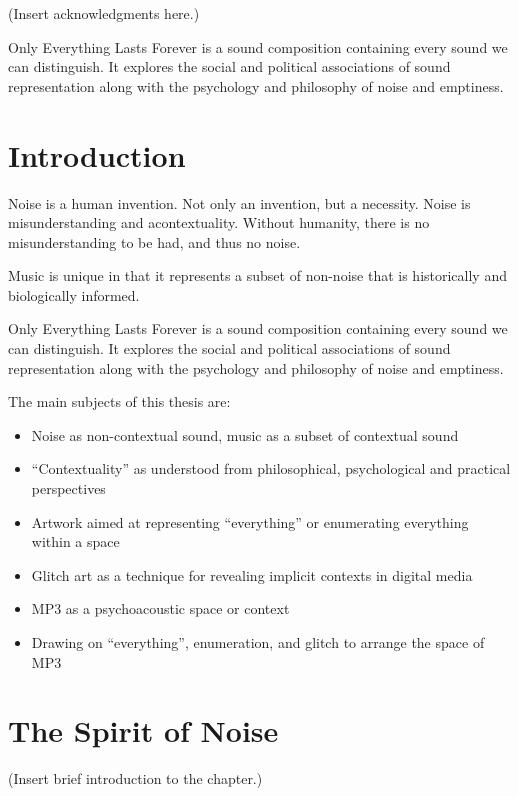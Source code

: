 \documentclass{thesis}
\author{Kyle McDonald}
\begin{document}
 
\titlepage
\tableofcontents

(Insert acknowledgments here.)

Only Everything Lasts Forever is a sound composition containing every sound we can distinguish. It explores the social and political associations of sound representation along with the psychology and philosophy of noise and emptiness.

\chapter{Introduction}
Noise is a human invention. Not only an invention, but a necessity. Noise is misunderstanding and acontextuality. Without humanity, there is no misunderstanding to be had, and thus no noise.

Music is unique in that it represents a subset of non-noise that is historically and biologically informed.

Only Everything Lasts Forever is a sound composition containing every sound we can distinguish. It explores the social and political associations of sound representation along with the psychology and philosophy of noise and emptiness.

The main subjects of this thesis are:

\begin{itemize}
	\item Noise as non-contextual sound, music as a subset of contextual sound
	\item ``Contextuality'' as understood from philosophical, psychological and practical perspectives
	\item Artwork aimed at representing ``everything'' or enumerating everything within a space
	\item Glitch art as a technique for revealing implicit contexts in digital media
	\item MP3 as a psychoacoustic space or context
	\item Drawing on ``everything'', enumeration, and glitch to arrange the space of MP3
\end{itemize}

\chapter{The Spirit of Noise}
(Insert brief introduction to the chapter.)
\end{document}
